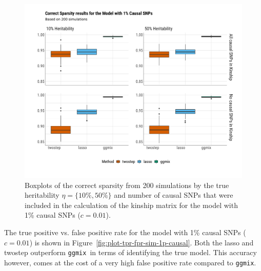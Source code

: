 \documentclass[12pt,letter]{article}\usepackage[]{graphicx}\usepackage[]{color}
\newenvironment{knitrout}{}{} %
\newcommand{\ggmix}{\texttt{ggmix}}
\begin{document}
\begin{knitrout}\scriptsize
{}\color{fgcolor}\begin{figure}[h]

{\centering \includegraphics[width=1\linewidth]{figure/plot-correct-sparsity-sim-1p-causal-1} 

}

\caption[Boxplots of the correct sparsity from 200 simulations by the true heritability $\eta = \lbrace 10\%, 50\% \rbrace$ and number of causal SNPs that were included in the calculation of the kinship matrix for the model with 1\% causal SNPs ($c=0.01$)]{Boxplots of the correct sparsity from 200 simulations by the true heritability $\eta = \lbrace 10\%, 50\% \rbrace$ and number of causal SNPs that were included in the calculation of the kinship matrix for the model with 1\% causal SNPs ($c=0.01$).}\label{fig:plot-correct-sparsity-sim-1p-causal}
\end{figure}


\end{knitrout}


The true positive vs. false positive rate for the model with 1\% causal SNPs ($c=0.01$) is shown in Figure~\ref{fig:plot-tpr-fpr-sim-1p-causal}. Both the lasso and twostep outperform \ggmix ~in terms of identifying the true model. This accuracy however, comes at the cost of a very high false positive rate compared to \ggmix.
\end{document}
